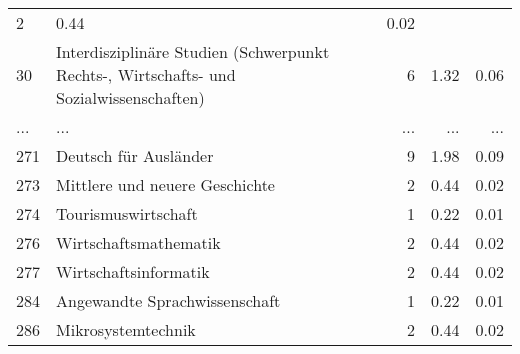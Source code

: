 \begin{longtable}{lXrrr}
          \num{2} &
          \num[round-mode=places,round-precision=2]{0.44} &
          \num[round-mode=places,round-precision=2]{0.02} \\
        30 & \multicolumn{1}{X}{Interdisziplinäre Studien (Schwerpunkt Rechts-, Wirtschafts- und Sozialwissenschaften)} & %
          \num{6} &
          \num[round-mode=places,round-precision=2]{1.32} &
          \num[round-mode=places,round-precision=2]{0.06} \\
       ... & ... & ... & ... & ... \\
        271 & \multicolumn{1}{X}{Deutsch für Ausländer} & %
          \num{9} &
          \num[round-mode=places,round-precision=2]{1.98} &
          \num[round-mode=places,round-precision=2]{0.09} \\

        273 & \multicolumn{1}{X}{Mittlere und neuere Geschichte} & %
          \num{2} &
          \num[round-mode=places,round-precision=2]{0.44} &
          \num[round-mode=places,round-precision=2]{0.02} \\

        274 & \multicolumn{1}{X}{Tourismuswirtschaft} & %
          \num{1} &
          \num[round-mode=places,round-precision=2]{0.22} &
          \num[round-mode=places,round-precision=2]{0.01} \\

        276 & \multicolumn{1}{X}{Wirtschaftsmathematik} & %
          \num{2} &
          \num[round-mode=places,round-precision=2]{0.44} &
          \num[round-mode=places,round-precision=2]{0.02} \\

        277 & \multicolumn{1}{X}{Wirtschaftsinformatik} & %
          \num{2} &
          \num[round-mode=places,round-precision=2]{0.44} &
          \num[round-mode=places,round-precision=2]{0.02} \\

        284 & \multicolumn{1}{X}{Angewandte Sprachwissenschaft} & %
          \num{1} &
          \num[round-mode=places,round-precision=2]{0.22} &
          \num[round-mode=places,round-precision=2]{0.01} \\

        286 & \multicolumn{1}{X}{Mikrosystemtechnik} & %
          \num{2} &
          \num[round-mode=places,round-precision=2]{0.44} &
          \num[round-mode=places,round-precision=2]{0.02} \\


\end{longtable}

